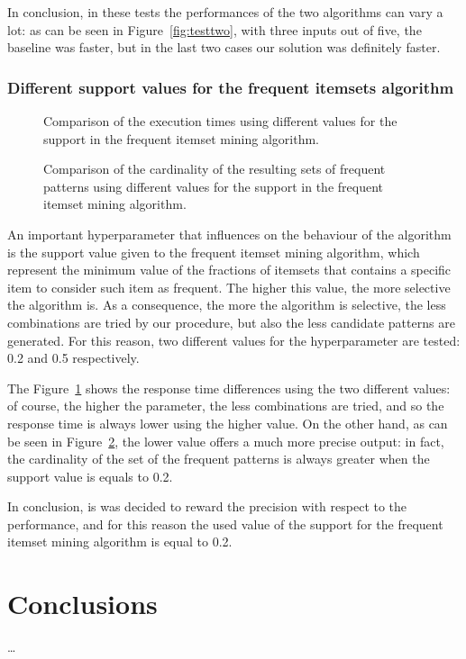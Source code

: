 \documentclass{acm_proc_article-sp-sigmod09}
\begin{document}
In conclusion, in these tests the performances of the two algorithms can vary a lot: as can be seen in Figure~\ref{fig:testtwo}, with three inputs out of five, the baseline was faster, but in the last two cases our solution was definitely faster.

\subsubsection{Different support values for the frequent itemsets algorithm}

\begin{figure}
\centering
{}
\caption{Comparison of the execution times using different values for the support in the frequent itemset mining algorithm.}
\label{fig:test3}
\end{figure}

\begin{figure}
\centering
{}
\caption{Comparison of the cardinality of the resulting sets of frequent patterns using different values for the support in the frequent itemset mining algorithm.}
\label{fig:test4}
\end{figure}

An important hyperparameter that influences on the behaviour of the algorithm is the support value given to the frequent itemset mining algorithm, which represent the minimum value of the fractions of itemsets that contains a specific item to consider such item as frequent. The higher this value, the more selective the algorithm is. As a consequence, the more the algorithm is selective, the less combinations are tried by our procedure, but also the less candidate patterns are generated. For this reason, two different values for the hyperparameter are tested: 0.2 and 0.5 respectively.

The Figure~\ref{fig:test3} shows the response time differences using the two different values: of course, the higher the parameter, the less combinations are tried, and so the response time is always lower using the higher value. On the other hand, as can be seen in Figure~\ref{fig:test4}, the lower value offers a much more precise output: in fact, the cardinality of the set of the frequent patterns is always greater when the support value is equals to 0.2.

In conclusion, is was decided to reward the precision with respect to the performance, and for this reason the used value of the support for the frequent itemset mining algorithm is equal to 0.2.

\section{Conclusions}
\dots

%

\end{document}
